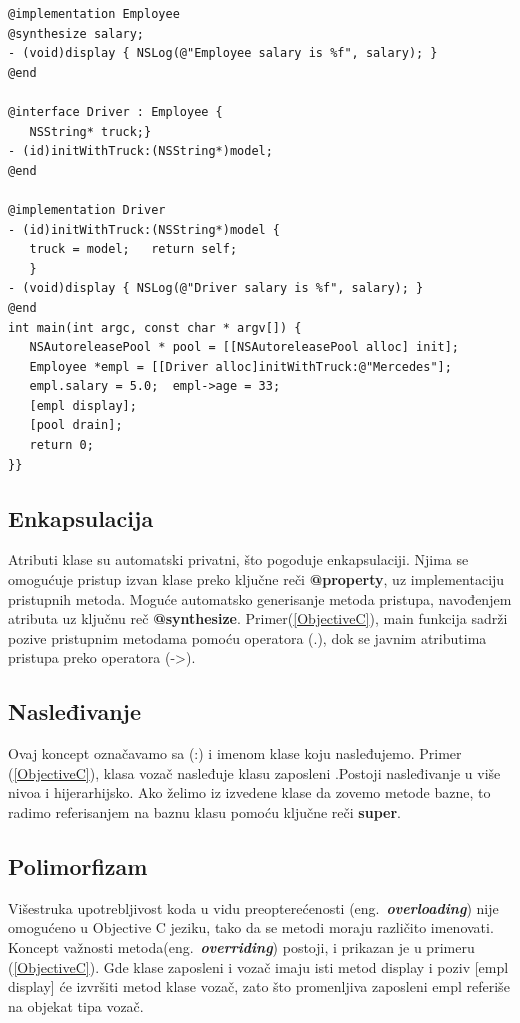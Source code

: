 \documentclass[a4paper]{article}
\begin{document}
{\begin{lstlisting}[caption={Primer koda u Objective C jeziku},frame=single, label=ObjectiveC]
@implementation Employee
@synthesize salary; 
- (void)display { NSLog(@"Employee salary is %f", salary); }
@end

@interface Driver : Employee {
   NSString* truck;}
- (id)initWithTruck:(NSString*)model;
@end

@implementation Driver
- (id)initWithTruck:(NSString*)model {
   truck = model;	return self;
   }
- (void)display { NSLog(@"Driver salary is %f", salary); }
@end
int main(int argc, const char * argv[]) {
   NSAutoreleasePool * pool = [[NSAutoreleasePool alloc] init];
   Employee *empl = [[Driver alloc]initWithTruck:@"Mercedes"];
   empl.salary = 5.0;  empl->age = 33;
   [empl display];
   [pool drain];
   return 0;
}}
\end{lstlisting}

\subsection{Enkapsulacija}
\label{subsec:ObjCEnkapsulacija}

Atributi klase su automatski privatni, što pogoduje enkapsulaciji. Njima se omogućuje pristup izvan klase preko ključne reči \textbf{@property}, uz implementaciju pristupnih metoda. Moguće automatsko generisanje metoda pristupa, navođenjem atributa uz ključnu reč \textbf{@synthesize}. Primer(\ref{ObjectiveC}), main funkcija sadrži pozive pristupnim metodama pomoću operatora (.), dok se javnim atributima pristupa preko operatora (->).

\subsection{Nasleđivanje}
\label{subsec:ObjCNasledjivanje}

Ovaj koncept označavamo sa (:) i imenom klase koju nasleđujemo. Primer (\ref{ObjectiveC}), klasa vozač nasleđuje klasu zaposleni .Postoji nasleđivanje u više nivoa i hijerarhijsko. Ako želimo iz izvedene klase da zovemo metode bazne, to radimo referisanjem na baznu klasu pomoću ključne reči \textbf{super}.

\subsection{Polimorfizam}
\label{subsec:ObjCPolimorfizam}

Višestruka upotrebljivost koda u vidu preopterećenosti (eng.~\textbf{\em overloading}) nije omogućeno u Objective C jeziku, tako da se metodi moraju različito imenovati\cite{ObjectiveCbook}. Koncept važnosti metoda(eng.~\textbf{\em overriding})  postoji, i prikazan je u primeru (\ref{ObjectiveC}). Gde klase zaposleni i vozač imaju isti metod display i poziv [empl display] će izvršiti metod klase vozač, zato što promenljiva zaposleni empl referiše na objekat tipa vozač.

}
\end{document}
